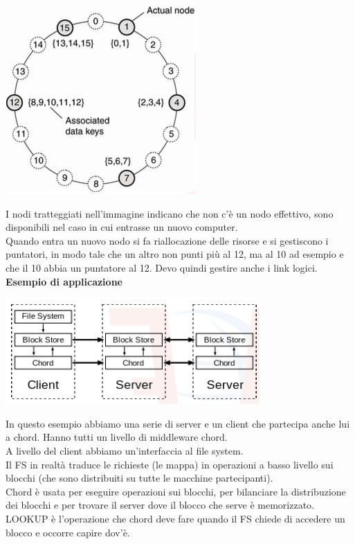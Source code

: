 \begin{center}
    \includegraphics[width = .5\textwidth]{images/lezione2/chord.png}
\end{center}
I nodi tratteggiati nell'immagine indicano che non c'è un nodo effettivo, sono disponibili nel caso in cui entrasse un nuovo computer. \\
Quando entra un nuovo nodo si fa riallocazione delle risorse e si gestiscono i puntatori, in modo tale che un altro non punti più al 12, ma al 10 ad esempio e che il 10 abbia un puntatore al 12. Devo quindi gestire anche i link logici. 
\textbf{Esempio di applicazione} 
\begin{center}
    \includegraphics[width = .4\textwidth]{images/lezione2/applicazione-chord.png}
\end{center}
In questo esempio abbiamo una serie di server e un client che partecipa anche lui a chord. Hanno tutti un livello di middleware chord.\\
A livello del client abbiamo un'interfaccia al file system. \\
Il FS in realtà traduce le richieste (le mappa) in operazioni a basso livello sui blocchi (che sono distribuiti su tutte le macchine partecipanti). \\
Chord è usata per eseguire operazioni sui blocchi, per bilanciare la distribuzione dei blocchi e per trovare il server dove il blocco che serve è memorizzato.\\ LOOKUP è l'operazione che chord deve fare quando il FS chiede di accedere un blocco e occorre capire dov'è.

